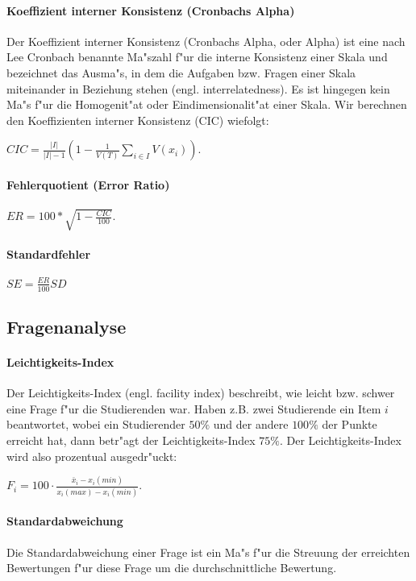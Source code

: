 \documentclass[12pt]{report}
\begin{document}
\paragraph{Koeffizient interner Konsistenz (Cronbachs Alpha)}
Der Koeffizient interner Konsistenz (Cronbachs Alpha, oder Alpha) ist eine nach Lee Cronbach benannte Ma"szahl f"ur die interne Konsistenz einer Skala und bezeichnet das Ausma"s, in dem die Aufgaben bzw. Fragen einer Skala miteinander in Beziehung stehen (engl. interrelatedness). Es ist hingegen kein Ma"s f"ur die Homogenit"at oder Eindimensionalit"at einer Skala. Wir berechnen den Koeffizienten interner Konsistenz (CIC) wiefolgt:

$CIC=\frac{|I|}{|I|-1}\left(1-\frac{1}{V(T)}\sum\limits_{i\in I}V(x_i)\right)$.

\paragraph{Fehlerquotient (Error Ratio)}

$ER=100*\sqrt{1-\frac{CIC}{100}}$.

\paragraph{Standardfehler}

$SE=\frac{ER}{100}SD$


\subsection{Fragenanalyse}
\label{subsubsec:questions}

\paragraph{Leichtigkeits-Index}
Der Leichtigkeits-Index (engl. facility index) beschreibt, wie leicht bzw. schwer eine Frage f"ur die Studierenden war. 
Haben z.B. zwei Studierende ein Item $i$ beantwortet, wobei ein Studierender $50\%$ und der andere $100\%$ der Punkte erreicht hat, dann betr"agt der Leichtigkeits-Index $75\%$. Der Leichtigkeits-Index wird also prozentual ausgedr"uckt:

$F_i = 100\cdot\frac{\bar{x}_i - x_i(min)}{x_i(max) - x_i(min)}$. 

\paragraph{Standardabweichung}
Die Standardabweichung einer Frage ist ein Ma"s f"ur die Streuung der erreichten Bewertungen f"ur diese Frage um die durchschnittliche Bewertung. 
\end{document}
